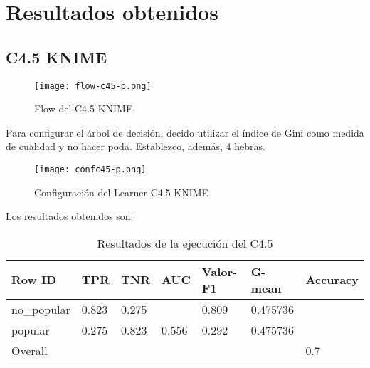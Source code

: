 
\section{Resultados obtenidos}

\subsection{C4.5 KNIME}

\begin{figure}[H] %
	\centering
	\texttt{[image: flow-c45-p.png]}  %
	\caption{Flow del C4.5 KNIME} 
	\label{fig:flowc4.5}
\end{figure}



Para configurar el árbol de decisión, decido utilizar el índice de Gini como medida de cualidad y no hacer poda. Establezco, además, 4 hebras.

\begin{figure}[H] %
	\centering
	\texttt{[image: confc45-p.png]}  %
	\caption{Configuración del Learner C4.5 KNIME} 
	\label{fig:confc45-p}
\end{figure}

Los resultados obtenidos son:

\begin{table}[H]
	\centering
	\begin{tabular}{|l|l|l|l|l|l|l|}
		\hline
		Row ID      & TPR   & TNR   & AUC   & Valor-F1 & G-mean   & Accuracy \\ \hline
		no\_popular & 0.823 & 0.275 &       & 0.809    & 0.475736 &          \\ \hline
		popular     & 0.275 & 0.823 & 0.556 & 0.292    & 0.475736 &          \\ \hline
		Overall     &       &       &       &          &          & 0.7      \\ \hline
	\end{tabular}
	\caption{Resultados de la ejecución del C4.5}
	\label{tab:c45}
\end{table}

